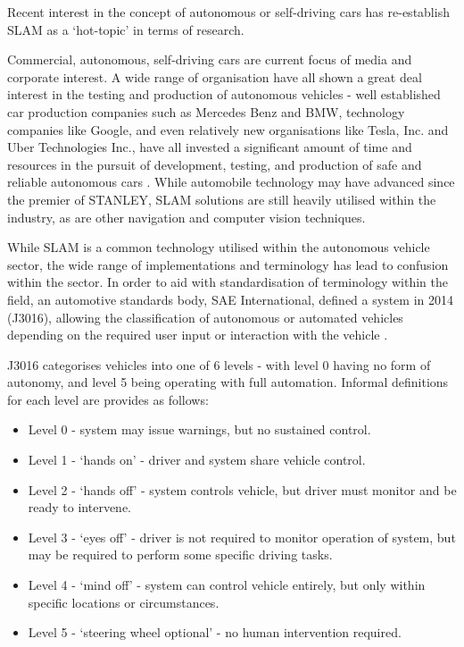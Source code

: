 Recent interest in the concept of autonomous or self-driving cars has
re-establish SLAM as a `hot-topic' in terms of research.

Commercial, autonomous, self-driving cars are current focus of media and
corporate interest.
A wide range of organisation have all shown a great deal interest in the testing
and production of autonomous vehicles - well established car production
companies such as Mercedes Benz and BMW, technology companies like Google, and
even relatively new organisations like Tesla, Inc. and Uber Technologies Inc.,
have all invested a significant amount of time and resources in the pursuit of
development, testing, and production of safe and reliable autonomous cars
\cite{waymo,tesla,uber,mercedes,bmw_2018}.
While automobile technology may have advanced since the premier of STANLEY,
SLAM solutions are still heavily utilised within the industry, as are other
navigation and computer vision techniques.

While SLAM is a common technology utilised within the autonomous vehicle
sector, the wide range of implementations and terminology has lead to confusion
within the sector.
In order to aid with standardisation of terminology within the field, an
automotive standards body, SAE International, defined a system in 2014
(J3016), allowing the classification of autonomous or automated vehicles
depending on the required user input or interaction with the vehicle
\cite{standard2014j3016}.

J3016 categorises vehicles into one of 6 levels - with level 0 having no form
of autonomy, and level 5 being operating with full automation.
Informal definitions for each level are provides as follows:

\begin{itemize}
\item Level 0 - system may issue warnings, but no sustained control.
\item Level 1 - `hands on' - driver and system share vehicle control.
\item Level 2 - `hands off' - system controls vehicle, but driver must monitor
                and be ready to intervene.
\item Level 3 - `eyes off' - driver is not required to monitor operation of
                system, but may be required to perform some specific driving
                tasks.  
\item Level 4 - `mind off' - system can control vehicle entirely, but only
                within specific locations or circumstances.
\item Level 5 - `steering wheel optional' - no human intervention required.
\end{itemize}

